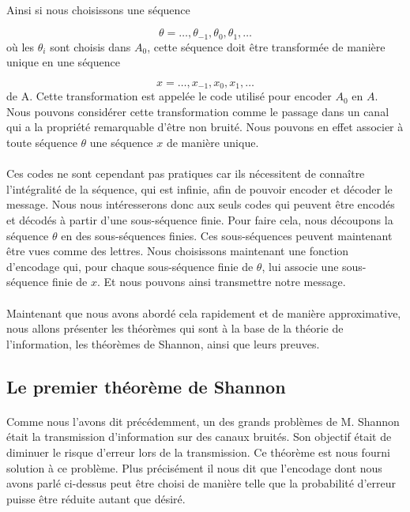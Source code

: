 	\paragraph{}
	Ainsi si nous choisissons une séquence

	\[\theta = \dots,\theta_{-1},\theta_{0},\theta_{1},\dots\]
	où les $\theta_i$ sont choisis dans $A_0$, cette séquence doit être
	transformée de manière unique en une séquence

	\[x = \dots,x_{-1},x_{0},x_{1},\dots\]
	de A. Cette transformation est appelée le code utilisé pour encoder $A_0$
	en $A$. Nous pouvons considérer cette transformation comme le passage dans
	un canal qui a la propriété remarquable d'être non bruité. Nous pouvons en
	effet associer à toute séquence $\theta$ une séquence $x$ 
	de manière unique. 

	\paragraph{}
	Ces codes ne sont cependant pas pratiques car ils nécessitent de connaître
	l'intégralité de la séquence, qui est infinie, afin de pouvoir encoder et 
	décoder le message. Nous  nous intéresserons donc aux seuls codes qui
	peuvent être encodés et décodés à partir d'une sous-séquence finie. Pour 
	faire cela, nous découpons la séquence $\theta$ en des sous-séquences 
	finies. Ces sous-séquences peuvent maintenant être vues comme des lettres. 
	Nous choisissons maintenant une fonction d'encodage qui, pour chaque 
	sous-séquence finie de $\theta$, lui associe une sous-séquence finie
	de $x$. Et nous pouvons ainsi transmettre notre message.
	
	\paragraph{}
	Maintenant que nous avons abordé cela rapidement et de manière 
	approximative, nous allons présenter les théorèmes qui sont à la base
	de la théorie de l'information, les théorèmes
	de Shannon, ainsi que leurs preuves.

\subsection{Le premier théorème de Shannon}

	\paragraph{}
	Comme nous l'avons dit précédemment, un des grands problèmes de M. Shannon
	était la transmission d'information sur des canaux bruités. Son objectif
	était de diminuer le risque d'erreur lors de la transmission. Ce théorème
	est nous fourni solution à ce problème. Plus précisément il nous dit que 
	l'encodage dont nous avons parlé ci-dessus peut être choisi de manière 
	telle que la probabilité d'erreur puisse être réduite autant que désiré.

